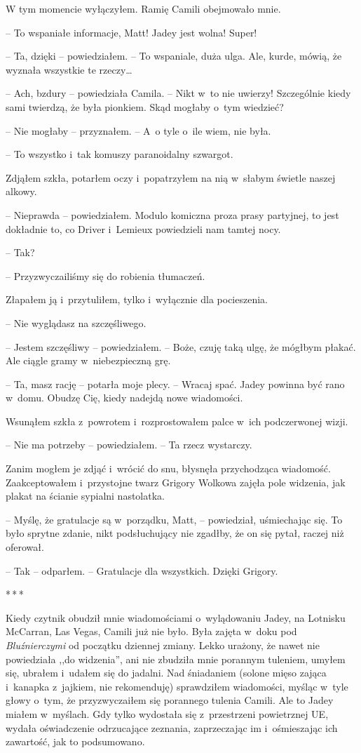 \documentclass[oneside,polish,12pt,sfheadings]{mwbk}
\newcommand{\threeast}{\bigskip\par\centerline{*\,*\,*}\medskip\par}%
\begin{document}
W tym momencie wyłączyłem. Ramię Camili obejmowało mnie.

-- To wspaniałe informacje, Matt! Jadey jest wolna! Super!

-- Ta, dzięki -- powiedziałem. -- To wspaniale, duża ulga. Ale, kurde,
mówią, że wyznała wszystkie te rzeczy\ldots

-- Ach, bzdury -- powiedziała Camila. -- Nikt w~to nie uwierzy! Szczególnie
kiedy sami twierdzą, że była pionkiem. Skąd mogłaby o~tym wiedzieć?

-- Nie mogłaby -- przyznałem. -- A~o tyle o~ile wiem, nie była.

-- To wszystko i~tak komuszy paranoidalny szwargot.

Zdjąłem szkła, potarłem oczy i~popatrzyłem na nią w~słabym świetle
naszej alkowy.

-- Nieprawda -- powiedziałem. Modulo komiczna proza prasy partyjnej, to
jest dokładnie to, co Driver i~Lemieux powiedzieli nam tamtej nocy.

-- Tak?

-- Przyzwyczailiśmy się do robienia tłumaczeń.

Złapałem ją i~przytuliłem, tylko i~wyłącznie dla pocieszenia.

-- Nie wyglądasz na szczęśliwego.

-- Jestem szczęśliwy -- powiedziałem. -- Boże, czuję taką ulgę, że mógłbym
płakać. Ale ciągle gramy w~niebezpieczną grę.

-- Ta, masz rację -- potarła moje plecy. -- Wracaj spać. Jadey powinna być
rano w~domu. Obudzę Cię, kiedy nadejdą nowe wiadomości.

Wsunąłem szkła z~powrotem i~rozprostowałem palce w~ich podczerwonej
wizji.

-- Nie ma potrzeby -- powiedziałem. -- Ta rzecz wystarczy.

Zanim mogłem je zdjąć i~wrócić do snu, błysnęła przychodząca wiadomość.
Zaakceptowałem i~przystojne twarz Grigory Wolkowa zajęła pole widzenia,
jak plakat na ścianie sypialni nastolatka.

-- Myślę, że gratulacje są w~porządku, Matt, -- powiedział, uśmiechając
się. To było sprytne zdanie, nikt podsłuchujący nie zgadłby, że on się
pytał, raczej niż oferował.

-- Tak -- odparłem. -- Gratulacje dla wszystkich. Dzięki Grigory.

\threeast

Kiedy czytnik obudził mnie wiadomościami o~wylądowaniu Jadey, na
Lotnisku McCarran, Las Vegas, Camili już nie było. Była zajęta w~doku
pod \emph{Bluźnierczymi} od początku dziennej zmiany. Lekko urażony, że
nawet nie powiedziała ,,do widzenia'', ani nie zbudziła mnie porannym
tuleniem, umyłem się, ubrałem i~udałem się do jadalni. Nad śniadaniem
(solone mięso zająca i~kanapka z~jajkiem, nie rekomenduję) sprawdziłem
wiadomości, myśląc w~tyle głowy o~tym, że przyzwyczaiłem się porannego
tulenia Camili. Ale to Jadey miałem w~myślach. Gdy tylko wydostała się z~przestrzeni powietrznej UE, wydała oświadczenie odrzucające zeznania,
zaprzeczając im i~ośmieszając ich zawartość, jak to podsumowano.
\end{document}
